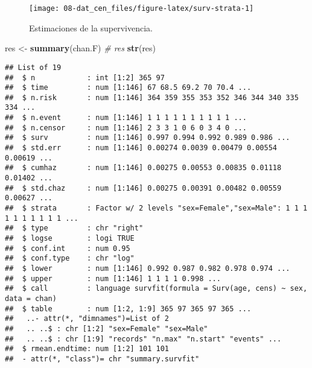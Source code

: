 \documentclass[
]{book}
\newenvironment{Shaded}{\begin{snugshade}}{\end{snugshade}}
\newcommand{\CommentTok}[1]{\textcolor[rgb]{0.56,0.35,0.01}{\textit{#1}}}
\newcommand{\KeywordTok}[1]{\textcolor[rgb]{0.13,0.29,0.53}{\textbf{#1}}}
\newcommand{\NormalTok}[1]{#1}
\newcommand{\OperatorTok}[1]{\textcolor[rgb]{0.81,0.36,0.00}{\textbf{#1}}}
\newcommand{\StringTok}[1]{\textcolor[rgb]{0.31,0.60,0.02}{#1}}
\theoremstyle{break}
\theoremstyle{definition}
\theoremstyle{definition}
\theoremstyle{definition}
\theoremstyle{remark}
\begin{document}
\begin{figure}[!htb]

{\centering \texttt{[image: 08-dat\_cen\_files/figure-latex/surv-strata-1]} 

}

\caption{Estimaciones de la supervivencia.}\label{fig:surv-strata}
\end{figure}

\begin{Shaded}
\begin{Highlighting}[]
\NormalTok{res <-}\StringTok{ }\KeywordTok{summary}\NormalTok{(chan.F)}
\CommentTok{# res}
\KeywordTok{str}\NormalTok{(res)}
\end{Highlighting}
\end{Shaded}

\begin{verbatim}
## List of 19
##  $ n            : int [1:2] 365 97
##  $ time         : num [1:146] 67 68.5 69.2 70 70.4 ...
##  $ n.risk       : num [1:146] 364 359 355 353 352 346 344 340 335 334 ...
##  $ n.event      : num [1:146] 1 1 1 1 1 1 1 1 1 1 ...
##  $ n.censor     : num [1:146] 2 3 3 1 0 6 0 3 4 0 ...
##  $ surv         : num [1:146] 0.997 0.994 0.992 0.989 0.986 ...
##  $ std.err      : num [1:146] 0.00274 0.0039 0.00479 0.00554 0.00619 ...
##  $ cumhaz       : num [1:146] 0.00275 0.00553 0.00835 0.01118 0.01402 ...
##  $ std.chaz     : num [1:146] 0.00275 0.00391 0.00482 0.00559 0.00627 ...
##  $ strata       : Factor w/ 2 levels "sex=Female","sex=Male": 1 1 1 1 1 1 1 1 1 1 ...
##  $ type         : chr "right"
##  $ logse        : logi TRUE
##  $ conf.int     : num 0.95
##  $ conf.type    : chr "log"
##  $ lower        : num [1:146] 0.992 0.987 0.982 0.978 0.974 ...
##  $ upper        : num [1:146] 1 1 1 1 0.998 ...
##  $ call         : language survfit(formula = Surv(age, cens) ~ sex, data = chan)
##  $ table        : num [1:2, 1:9] 365 97 365 97 365 ...
##   ..- attr(*, "dimnames")=List of 2
##   .. ..$ : chr [1:2] "sex=Female" "sex=Male"
##   .. ..$ : chr [1:9] "records" "n.max" "n.start" "events" ...
##  $ rmean.endtime: num [1:2] 101 101
##  - attr(*, "class")= chr "summary.survfit"
\end{verbatim}

\begin{Shaded}
\end{Shaded}
\end{document}
